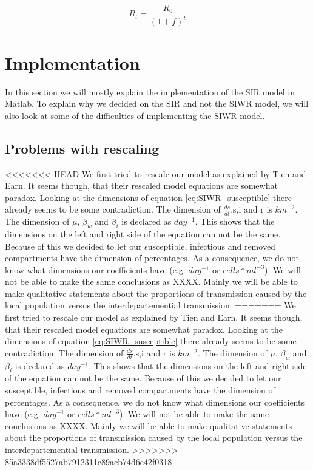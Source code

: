 \documentclass[11pt]{article}
\begin{document}
\begin{equation}
R_{t}=\dfrac{R_{0}}{(1+f)^{t}}
\label{eq:rep_number}
\end{equation}










\section{Implementation}
In this section we will mostly explain the implementation of the SIR model in Matlab. To explain why we decided on the SIR and not the SIWR model, we will also look at some of the difficulties of implementing the SIWR model.

\subsection{Problems with rescaling}
<<<<<<< HEAD
We first tried to rescale our model as explained by Tien and Earn. It seems though, that their rescaled model equations are somewhat paradox. Looking at the dimensions of equation \eqref{eq:SIWR_susceptible} there already seems to be some contradiction. The dimension of $\frac{ds}{dt}$,s,i and r is $km^{-2}$. The dimension of $\mu$, $\beta_{w}$ and $\beta_{i}$ is declared as $day^{-1}$. This shows that the dimensions on the left and right side of the equation can not be the same. Because of this we decided to let our susceptible, infectious and removed compartments have the dimension of percentages. As a consequence, we do not know what dimensions our coefficients have (e.g. $day^{-1}$ or $cells*ml^{-3}$). We will not be able to make the same conclusions as XXXX. Mainly we will be able to make qualitative statements about the proportions of transmission caused by the local population versus the interdepartemential transmission.
=======
We first tried to rescale our model as explained by Tien and Earn. It seems though, that their rescaled model equations are somewhat paradox. Looking at the dimensions of equation \eqref{eq:SIWR_susceptible} there already seems to be some contradiction. The dimension of $\frac{ds}{dt}$,s,i and r is $km^{-2}$. The dimension of $\mu$, $\beta_{w}$ and $\beta_{i}$ is declared as $day^{-1}$. This shows that the dimensions on the left and right side of the equation can not be the same. Because of this we decided to let our susceptible, infectious and removed compartments have the dimension of percentages. As a consequence, we do not know what dimensions our coefficients have (e.g. $day^{-1}$ or $cells*ml^{-3}$). We will not be able to make the same conclusions as XXXX. Mainly we will be able to make qualitative statements about the proportions of transmission caused by the local population versus the interdepartemential transmission.
>>>>>>> 85a3338df5527ab7912311c89acb74d6e42f0318
\end{document}
